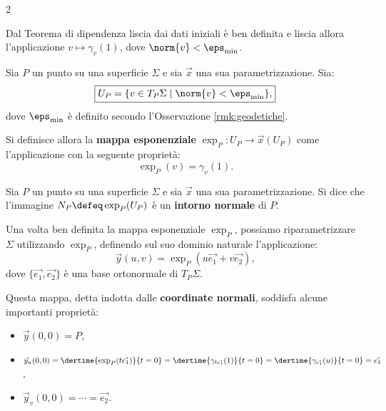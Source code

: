 \begin{multicols*}{2}
\begin{remark}
        Dal Teorema di dipendenza liscia dai dati iniziali è ben definita e liscia allora l'applicazione
        $v \mapsto \gamma_v(1)$, dove $\norm{v} < \eps_{\textnormal{min}}$.
    \end{remark}

    \begin{definition}
        Sia $P$ un punto su una superficie $\Sigma$ e sia $\vec{x}$ una sua parametrizzazione.
        Sia:
        \[
            \boxed{U_P = \{ v \in T_P \Sigma \mid \norm{v} < \eps_{\textnormal{min}} \},}
        \]
        dove $\eps_{\textnormal{min}}$ è definito secondo l'Osservazione \ref{rmk:geodetiche}. \smallskip

        Si definisce allora la \textbf{mappa esponenziale} $\exp_P : U_P \to \vec{x}(U_P)$ come l'applicazione
        con la seguente proprietà:
        \[
            \boxed{\exp_P(v) = \gamma_v(1).}
        \]
    \end{definition}

    \begin{definition}
        Sia $P$ un punto su una superficie $\Sigma$ e sia $\vec{x}$ una sua parametrizzazione.
        Si dice che l'immagine $N_P \defeq \exp_P(U_P)$ è un \textbf{intorno normale} di $P$.
    \end{definition}

    \begin{remark}
        Una volta ben definita la mappa esponenziale $\exp_P$, possiamo riparametrizzare
        $\Sigma$ utilizzando $\exp_P$, definendo sul suo dominio naturale l'applicazione:
        \[
            \vec{y}(u, v) = \exp_P(u \vec{e_1} + v \vec{e_2}),
        \]
        dove $\{\vec{e_1}, \vec{e_2}\}$ è una base ortonormale di $T_P \Sigma$. \smallskip

        Questa mappa, detta indotta dalle \textbf{coordinate normali}, soddisfa alcune
        importanti proprietà:
        \begin{itemize}
            \item $\vec{y}(0, 0) = P$,
            \item $\vec{y}_u(0, 0) = \dertime{\exp_P(t \vec{e_1})}{t=0} =
                      \dertime{\gamma_{t \vec{e_1}}(1)}{t=0} =
                      \dertime{\gamma_{\vec{e_1}} (u)}{t=0} = \vec{e_1}$,
            \item $\vec{y}_v(0, 0) = \cdots = \vec{e_2}$.
        \end{itemize}
    \end{remark}


\end{multicols*}
